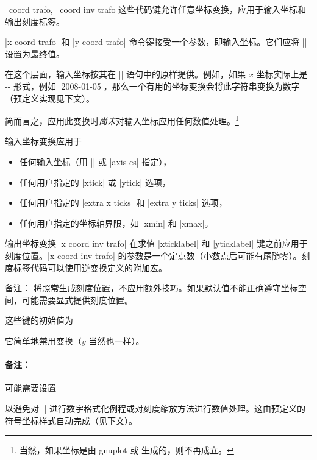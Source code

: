 \begin{pgfplotsxycodekeylist}{%
    \x\ coord trafo,
    \x\ coord inv trafo%
}
    这些代码键允许任意坐标变换，应用于输入坐标和输出刻度标签。

    |x coord trafo| 和 |y coord trafo| 命令键接受一个参数，即输入坐标。它们应将 |\pgfmathresult| 设置为最终值。

    在这个层面，输入坐标按其在 |\addplot| 语句中的原样提供。例如，如果 $x$ 坐标实际上是 -- 形式，例如 |2008-01-05|，那么一个有用的坐标变换会将此字符串变换为数字（预定义实现见下文）。

    简而言之，应用此变换时\emph{尚未}对输入坐标应用任何数值处理。\footnote{当然，如果坐标是由 gnuplot 或 \pgfname{} 生成的，则不再成立。}

    输入坐标变换应用于
    \begin{itemize}
        \item 任何输入坐标（用 |\addplot| 或 |axis cs| 指定），
        \item 任何用户指定的 |xtick| 或 |ytick| 选项，
        \item 任何用户指定的 |extra x ticks| 和 |extra y ticks| 选项，
        \item 任何用户指定的坐标轴界限，如 |xmin| 和 |xmax|。
    \end{itemize}

    输出坐标变换 |x coord inv trafo| 在求值 |xticklabel| 和 |yticklabel| 键之前应用于刻度位置。|x coord inv trafo| 的参数是一个定点数（小数点后可能有尾随零）。刻度标签代码可以使用逆变换定义的附加宏。

    备注：\PGFPlots{} 将照常生成刻度位置，不应用额外技巧。如果默认值不能正确遵守坐标空间，可能需要显式提供刻度位置。

    这些键的初始值为
\begin{codeexample}
\end{codeexample}
    \noindent 它简单地禁用变换（$y$ 当然也一样）。


    \paragraph{备注：}

    可能需要设置
\begin{codeexample}
\end{codeexample}
    \noindent 以避免对 |\tick| 进行数字格式化例程或对刻度缩放方法进行数值处理。这由预定义的符号坐标样式自动完成（见下文）。
\end{pgfplotsxycodekeylist}


